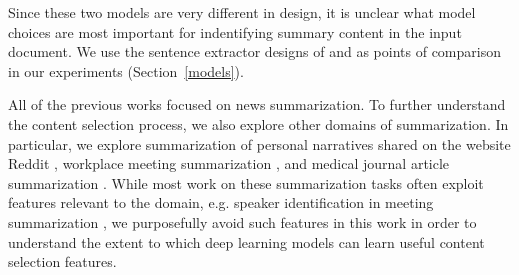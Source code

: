 Since these two models are very different in design, it is unclear 
what model choices are most important for indentifying summary content 
in the input document. We use the sentence extractor designs of 
\citep{cheng2016neural} and \citep{nallapati2017summarunner} as points of 
comparison in our experiments 
(Section~\ref{models}).

All of the previous works 
focused on news summarization. To further
understand the content selection process, we also explore other domains 
of summarization. In particular, we explore 
summarization of personal narratives shared
on the website Reddit \cite{ouyang2017crowd}, workplace meeting summarization
\cite{carletta2005ami}, and medical journal article summarization 
\cite{mishra2014text}. While most work on these summarization tasks
 often exploit 
features relevant
to the domain, e.g. speaker identification in meeting summarization \cite{gillick2009global},
we purposefully avoid such features in this work in order to understand 
the extent to which deep learning models can learn useful content 
selection features.










%
%
%
%


